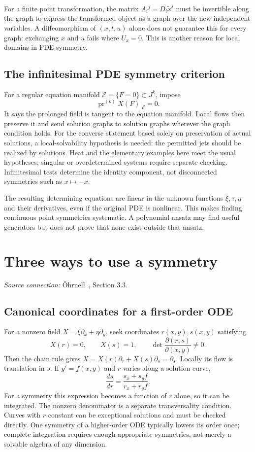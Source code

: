 \documentclass[11pt,a4paper]{article}
\numberwithin{equation}{section}
\theoremstyle{definition}
\theoremstyle{plain}
\theoremstyle{remark}
\newcommand{\pr}{\operatorname{pr}}
\newcommand{\source}[1]{\textit{Source connection:} \"Ohrnell~\cite{ohrnell}, #1.}
\begin{document}
For a finite point transformation, the matrix $A_i{}^j=D_i\widetilde x^j$ must be invertible along the graph to express the transformed object as a graph over the new independent variables. A diffeomorphism of $(x,t,u)$ alone does not guarantee this for every graph: exchanging $x$ and $u$ fails where $U_x=0$. This is another reason for local domains in PDE symmetry.

\subsection{The infinitesimal PDE symmetry criterion}
For a regular equation manifold $\mathcal E=\{F=0\}\subset J^k$, impose
\begin{equation}\label{eq:criterion}
\boxed{\pr^{(k)}X(F)\big|_{\mathcal E}=0.}
\end{equation}
It says the prolonged field is tangent to the equation manifold. Local flows then preserve it and send solution graphs to solution graphs wherever the graph condition holds. For the converse statement based solely on preservation of actual solutions, a local-solvability hypothesis is needed: the permitted jets should be realized by solutions. Heat and the elementary examples here meet the usual hypotheses; singular or overdetermined systems require separate checking. Infinitesimal tests determine the identity component, not disconnected symmetries such as $x\mapsto-x$.

The resulting determining equations are linear in the unknown functions $\xi,\tau,\eta$ and their derivatives, even if the original PDE is nonlinear. This makes finding continuous point symmetries systematic. A polynomial ansatz may find useful generators but does not prove that none exist outside that ansatz.

\section{Three ways to use a symmetry}\label{sec:methods}
\source{Section 3.3}
\subsection{Canonical coordinates for a first-order ODE}\label{sec:canonical}
For a nonzero field $X=\xi\partial_x+\eta\partial_y$, seek coordinates $r(x,y),s(x,y)$ satisfying
\[
X(r)=0,\qquad X(s)=1,\qquad
\det\frac{\partial(r,s)}{\partial(x,y)}\ne0.
\]
Then the chain rule gives $X=X(r)\partial_r+X(s)\partial_s=\partial_s$. Locally its flow is translation in $s$. If $y'=f(x,y)$ and $r$ varies along a solution curve,
\[
\frac{ds}{dr}=\frac{s_x+s_yf}{r_x+r_yf}.
\]
For a symmetry this expression becomes a function of $r$ alone, so it can be integrated. The nonzero denominator is a separate transversality condition. Curves with $r$ constant can be exceptional solutions and must be checked directly. One symmetry of a higher-order ODE typically lowers its order once; complete integration requires enough appropriate symmetries, not merely a solvable algebra of any dimension.
\end{document}
